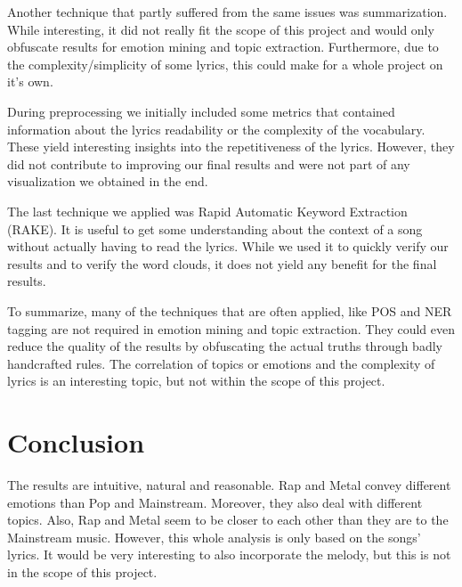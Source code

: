 \documentclass[10pt,a4paper]{article}
\begin{document}
	Another technique that partly suffered from the same issues was summarization. While interesting, it did not really fit the scope of this project and would only obfuscate results for emotion mining and topic extraction. Furthermore, due to the complexity/simplicity of some lyrics, this could make for a whole project on it's own.
	
	During preprocessing we initially included some metrics that contained information about the lyrics readability or the complexity of the vocabulary. These yield interesting insights into the repetitiveness of the lyrics. However, they did not contribute to improving our final results and were not part of any visualization we obtained in the end.
	
	The last technique we applied was Rapid Automatic Keyword Extraction (RAKE). It is useful to get some understanding about the context of a song without actually having to read the lyrics. While we used it to quickly verify our results and to verify the word clouds, it does not yield any benefit for the final results.
	
	To summarize, many of the techniques that are often applied, like POS and NER tagging are not required in emotion mining and topic extraction. They could even reduce the quality of the results by obfuscating the actual truths through badly handcrafted rules. The correlation of topics or emotions and the complexity of lyrics is an interesting topic, but not within the scope of this project. 

	\section{Conclusion}
	\label{sec:conclusion}
	The results are intuitive, natural and reasonable. Rap and Metal convey different emotions than Pop and Mainstream. Moreover, they also deal with different topics. Also, Rap and Metal seem to be closer to each other than they are to the Mainstream music. However, this whole analysis is only based on the songs' lyrics. It would be very interesting to also incorporate the melody, but this is not in the scope of this project.
	
	\newpage
	
	
	
	
\end{document}
